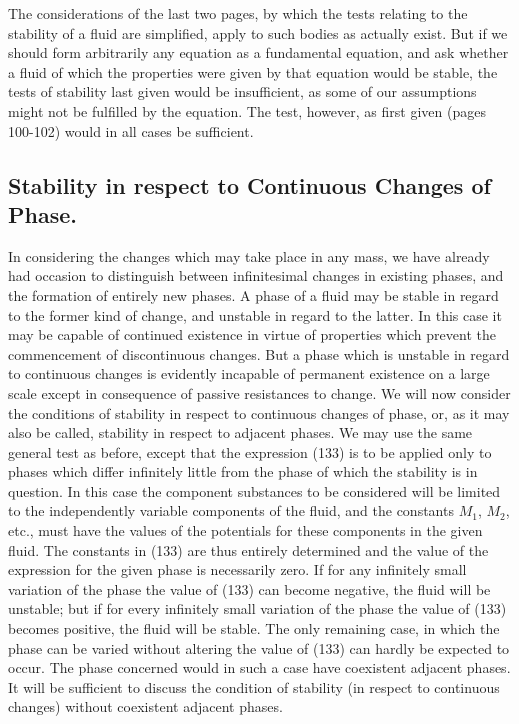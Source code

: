 \documentclass[12pt]{memoir}
\begin{document}
The considerations of the last two pages, by which the tests relating to the stability of a fluid are simplified, apply to such bodies as actually exist. But if we should form arbitrarily any equation as a fundamental equation, and ask whether a fluid of which the properties were given by that equation would be stable, the tests of stability last given would be insufficient, as some of our assumptions might not be fulfilled by the equation. The test, however, as first given (pages 100-102) would in all cases be sufficient.
\subsection{Stability in respect to Continuous Changes of Phase.}
In considering the changes which may take place in any mass, we have already had occasion to distinguish between infinitesimal changes in existing phases, and the formation of entirely new phases. A phase of a fluid may be stable in regard to the former kind of change, and unstable in regard to the latter. In this case it may be capable of continued existence in virtue of properties which prevent the commencement of discontinuous changes. But a phase which is unstable in regard to continuous changes is evidently incapable of permanent existence on a large scale except in consequence of passive resistances to change. We will now consider the conditions of stability in respect to continuous changes of phase, or, as it may also be called, stability in respect to adjacent phases. We may use the same general test as before, except that the expression (133) is to be applied only to phases which differ infinitely little from the phase of which the stability is in question. In this case the component substances to be considered will be limited to the independently variable components of the fluid, and the constants $M_1$, $M_2$, etc., must have the values of the potentials for these components in the given fluid. The constants in (133) are thus entirely determined and the value of the expression for the given phase is necessarily zero. If for any infinitely small variation of the phase the value of (133) can become negative, the fluid will be unstable; but if for every infinitely small variation of the phase the value of (133) becomes positive, the fluid will be stable. The only remaining case, in which the phase can be varied without altering the value of (133) can hardly be expected to occur. The phase concerned would in such a case have coexistent adjacent phases. It will be sufficient to discuss the condition of stability (in respect to continuous changes) without coexistent adjacent phases.
\end{document}
